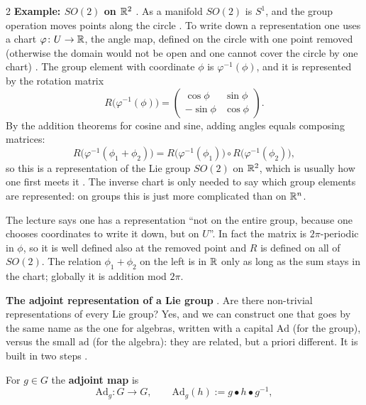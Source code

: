\begin{paracol}{2}
\textbf{Example: $SO(2)$ on $\mathbb{R}^2$} . As a manifold $SO(2)$ is $S^1$, and the group operation moves points along the circle . To write down a representation one uses a chart $\varphi\colon U\to\mathbb{R}$, the angle map, defined on the circle with one point removed (otherwise the domain would not be open and one cannot cover the circle by one chart)   . The group element with coordinate $\phi$ is $\varphi^{-1}(\phi)$, and it is represented by the rotation matrix
\[
  R\bigl(\varphi^{-1}(\phi)\bigr)=\begin{pmatrix}\cos\phi&\sin\phi\\-\sin\phi&\cos\phi\end{pmatrix}.
\]
By the addition theorems for cosine and sine, adding angles equals composing matrices:
\[
  R\bigl(\varphi^{-1}(\phi_1+\phi_2)\bigr)=R\bigl(\varphi^{-1}(\phi_1)\bigr)\circ R\bigl(\varphi^{-1}(\phi_2)\bigr),
\]
so this is a representation of the Lie group $SO(2)$ on $\mathbb{R}^2$, which is usually how one first meets it      . The inverse chart is only needed to say which group elements are represented: on groups this is just more complicated than on $\mathbb{R}^n$.
\begin{coursenote}
The lecture says one has a representation ``not on the entire group, because one chooses coordinates to write it down, but on $U$''. In fact the matrix is $2\pi$-periodic in $\phi$, so it is well defined also at the removed point and $R$ is defined on all of $SO(2)$. The relation $\phi_1+\phi_2$ on the left is in $\mathbb{R}$ only as long as the sum stays in the chart; globally it is addition mod $2\pi$. 
\end{coursenote}
\textbf{The adjoint representation of a Lie group} . Are there non-trivial representations of every Lie group? Yes, and we can construct one that goes by the same name as the one for algebras, written with a capital $\mathrm{Ad}$ (for the group), versus the small $\mathrm{ad}$ (for the algebra): they are related, but a priori different. It is built in two steps  .
\begin{definition}\label{def:rp-Ad}
For $g\in G$ the \textbf{adjoint map} is
\[
  \mathrm{Ad}_g\colon G\to G,\qquad \mathrm{Ad}_g(h):=g\bullet h\bullet g^{-1},
\]
\end{definition}
\end{paracol}
